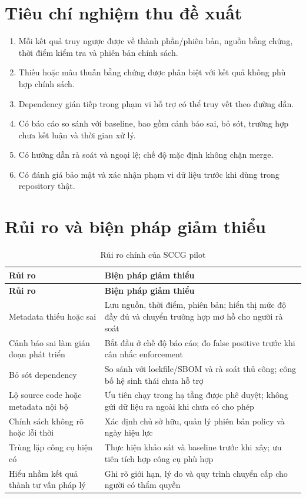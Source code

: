 \section{Tiêu chí nghiệm thu đề xuất}
\begin{enumerate}[label=\arabic*.]
    \item Mỗi kết quả truy ngược được về thành phần/phiên bản, nguồn bằng chứng, thời điểm kiểm tra và phiên bản chính sách.
    \item Thiếu hoặc mâu thuẫn bằng chứng được phân biệt với kết quả không phù hợp chính sách.
    \item Dependency gián tiếp trong phạm vi hỗ trợ có thể truy vết theo đường dẫn.
    \item Có báo cáo so sánh với baseline, bao gồm cảnh báo sai, bỏ sót, trường hợp chưa kết luận và thời gian xử lý.
    \item Có hướng dẫn rà soát và ngoại lệ; chế độ mặc định không chặn merge.
    \item Có đánh giá bảo mật và xác nhận phạm vi dữ liệu trước khi dùng trong repository thật.
\end{enumerate}

\section{Rủi ro và biện pháp giảm thiểu}
\begin{longtable}{p{}p{}}
\caption{Rủi ro chính của SCCG pilot}\label{tab:risks}\\
\toprule
\textbf{Rủi ro} & \textbf{Biện pháp giảm thiểu} \\
\midrule
\endfirsthead
\toprule
\textbf{Rủi ro} & \textbf{Biện pháp giảm thiểu} \\
\midrule
\endhead
Metadata thiếu hoặc sai & Lưu nguồn, thời điểm, phiên bản; hiển thị mức độ đầy đủ và chuyển trường hợp mơ hồ cho người rà soát \\
Cảnh báo sai làm gián đoạn phát triển & Bắt đầu ở chế độ báo cáo; đo false positive trước khi cân nhắc enforcement \\
Bỏ sót dependency & So sánh với lockfile/SBOM và rà soát thủ công; công bố hệ sinh thái chưa hỗ trợ \\
Lộ source code hoặc metadata nội bộ & Ưu tiên chạy trong hạ tầng được phê duyệt; không gửi dữ liệu ra ngoài khi chưa có cho phép \\
Chính sách không rõ hoặc lỗi thời & Xác định chủ sở hữu, quản lý phiên bản policy và ngày hiệu lực \\
Trùng lặp công cụ hiện có & Thực hiện khảo sát và baseline trước khi xây; ưu tiên tích hợp công cụ phù hợp \\
Hiểu nhầm kết quả thành tư vấn pháp lý & Ghi rõ giới hạn, lý do và quy trình chuyển cấp cho người có thẩm quyền \\
\bottomrule
\end{longtable}

